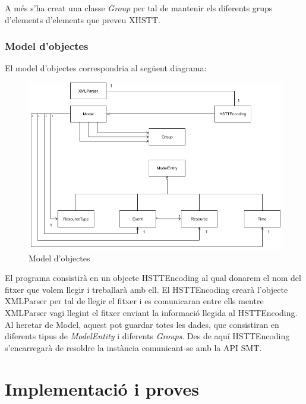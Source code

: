 \documentclass[11pt,a4paper,twoside]{report}
\begin{document}
  A més s'ha creat una classe \textit{Group} per tal de mantenir els diferents grups d'elements d'elements que preveu XHSTT.  


  \subsection{Model d'objectes}

  El model d'objectes correspondria al següent diagrama:
  \begin{figure}[H]
    \includegraphics[width=\textwidth]{Diagrames/UMLKai.png}
    \caption{Model d'objectes}
    \label{fig:ObjectModel}
  \end{figure}
  

  El programa consistirà en un objecte HSTTEncoding al qual donarem el nom del fitxer que volem llegir i treballarà amb ell. 
  El HSTTEncoding crearà l'objecte XMLParser per tal de llegir el fitxer i es comunicaran entre ells mentre XMLParser vagi llegint el fitxer enviant la informació llegida al HSTTEncoding. 
  Al heretar de Model, aquest pot guardar totes les dades, que consistiran en diferents tipus de \textit{ModelEntity} i diferents \textit{Groups}.
  Des de aquí HSTTEncoding s'encarregarà de resoldre la instància comunicant-se amb la API SMT.


  

  \chapter{Implementació i proves}
\end{document}
